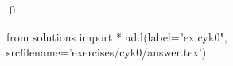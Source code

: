 
\begin{ex} 
  \label{ex:cyk0}
  
  \qed
\end{ex} 
\begin{python0}
from solutions import *
add(label="ex:cyk0",
    srcfilename='exercises/cyk0/answer.tex') 
\end{python0}
